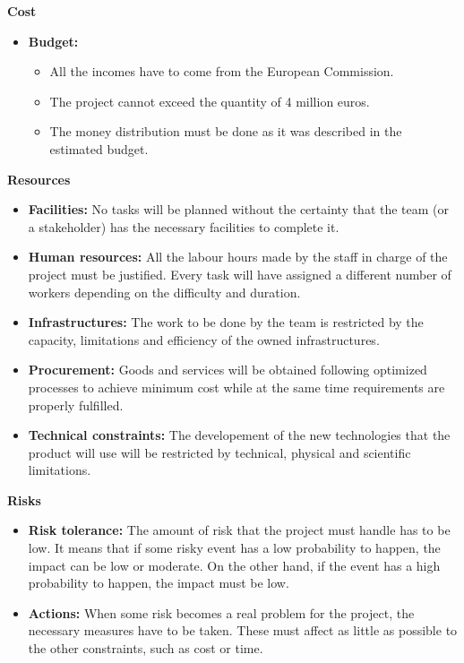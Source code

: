 \textbf{Cost}

\begin{itemize}
	
	\item \textbf{Budget:}
	
	\begin{itemize}
		\item All the incomes have to come from the European Commission.
		\item The project cannot exceed the quantity of 4 million euros.
		\item The money distribution must be done as it was described in the estimated budget.
	\end{itemize}

\end{itemize}

\textbf{Resources}

\begin{itemize}
	
	\item \textbf{Facilities:} No tasks will be planned without the certainty that the team (or a stakeholder) has the necessary facilities to complete it.
	
	\item \textbf{Human resources:} All the labour hours made by the staff in charge of the project must be justified. Every task will have assigned a different number of workers depending on the difficulty and duration.
	
	\item \textbf{Infrastructures:} The work to be done by the team is restricted by the capacity, limitations and efficiency of the owned infrastructures.
	
	\item \textbf{Procurement:} Goods and services will be obtained following optimized processes to achieve minimum cost while at the same time requirements are properly fulfilled.
	
	\item \textbf{Technical constraints:} The developement of the new technologies that the product will use will be restricted by technical, physical and scientific limitations.
	
	
\end{itemize}

\textbf{Risks}

\begin{itemize}
	
	\item \textbf{Risk tolerance:} The amount of risk that the project must handle has to be low. It means that if some risky event has a low probability to happen, the impact can be low or moderate. On the other hand, if the event has a high probability to happen, the impact must be low.
	
	\item \textbf{Actions:} When some risk becomes a real problem for the project, the necessary measures have to be taken. These must affect as little as possible to the other constraints, such as cost or time.
	
\end{itemize}

